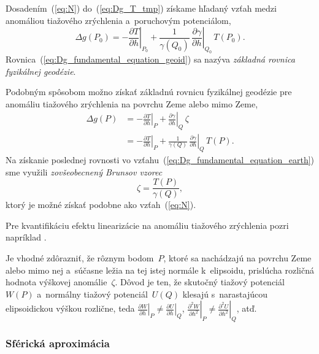 \documentclass[a4paper, 12pt]{book}
\begin{document}
Dosadením~(\ref{eq:N}) do~(\ref{eq:Dg_T_tmp}) získame hľadaný vzťah medzi 
anomáliou tiažového zrýchlenia a~poruchovým potenciálom,
%
\begin{equation}
\label{eq:Dg_fundamental_equation_geoid}
\Delta g(P_0) = -\left.\frac{\partial T}{\partial h}\right|_{P_0} 
+ \frac{1}{\gamma(Q_0)} \, \left.\frac{\partial \gamma}{\partial 
h}\right|_{Q_0} \, T(P_0){.}
\end{equation}
%
Rovnica~(\ref{eq:Dg_fundamental_equation_geoid}) sa nazýva \emph{základná 
rovnica fyzikálnej geodézie}.

Podobným spôsobom možno získať základnú rovnicu fyzikálnej geodézie pre 
anomáliu tiažového zrýchlenia na povrchu Zeme alebo mimo Zeme,
%
\begin{equation}
\label{eq:Dg_fundamental_equation_earth}
\begin{split}
\Delta g(P) &= -\left.\frac{\partial T}{\partial h}\right|_{P} 
+ \left.\frac{\partial \gamma}{\partial h}\right|_{Q} \, \zeta\\
%
&= -\left.\frac{\partial T}{\partial h}\right|_{P} + \frac{1}{\gamma(Q)} \, 
\left.\frac{\partial \gamma}{\partial h}\right|_{Q} \, T(P){.}
\end{split}
\end{equation}
%
Na získanie poslednej rovnosti vo 
vzťahu~(\ref{eq:Dg_fundamental_equation_earth}) sme využili \emph{zovšeobecnený 
Brunsov vzorec}
%
\begin{equation}
\label{eq:zeta}
\zeta = \frac{T(P)}{\gamma(Q)}{,}
\end{equation}
%
ktorý je možné získať podobne ako vzťah~(\ref{eq:N}).

Pre kvantifikáciu efektu linearizácie na anomáliu tiažového zrýchlenia pozri 
napríklad \textcite{Claessens2006}.

Je vhodné zdôrazniť, že rôznym bodom~$P$, ktoré sa nachádzajú na povrchu Zeme 
alebo mimo nej a~súčasne ležia na tej istej normále k~elipsoidu, prislúcha 
rozličná hodnota výškovej anomálie~$\zeta$.  Dôvod je ten, že skutočný tiažový 
potenciál~$W(P)$ a~normálny tiažový potenciál~$U(Q)$ klesajú s~narastajúcou 
elipsoidickou výškou rozlične, teda $\left.\frac{\partial W}{\partial 
h}\right|_P \neq \left.\frac{\partial U}{\partial h}\right|_Q$, 
$\left.\frac{\partial^2 W}{\partial h^2}\right|_P \neq \left.\frac{\partial^2 
U}{\partial h^2}\right|_Q$, atď.

\subsubsection{Sférická aproximácia}
\end{document}
